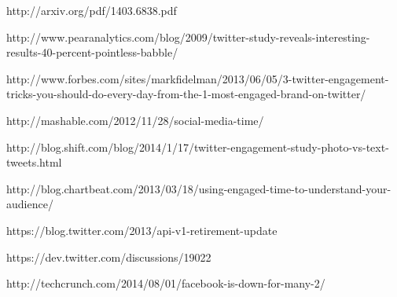 \begin{thebibliography}{9}
http://arxiv.org/pdf/1403.6838.pdf

http://www.pearanalytics.com/blog/2009/twitter-study-reveals-interesting-results-40-percent-pointless-babble/

http://www.forbes.com/sites/markfidelman/2013/06/05/3-twitter-engagement-tricks-you-should-do-every-day-from-the-1-most-engaged-brand-on-twitter/

http://mashable.com/2012/11/28/social-media-time/


http://blog.shift.com/blog/2014/1/17/twitter-engagement-study-photo-vs-text-tweets.html

http://blog.chartbeat.com/2013/03/18/using-engaged-time-to-understand-your-audience/

https://blog.twitter.com/2013/api-v1-retirement-update

https://dev.twitter.com/discussions/19022


http://techcrunch.com/2014/08/01/facebook-is-down-for-many-2/
  
\end{thebibliography}


